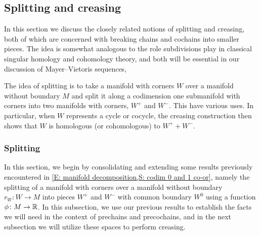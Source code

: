 \begin{comment}
	For the third product, we have by Joyce's convention that \red{I'm not getting a simple description of this because of Joyce's desription.
		Note that it requires using a specific identification of $TV \oplus TW$ with $TP \oplus TM$.
		I compute that even if we use identify $TM = \nu W \oplus TP \oplus \nu V$, $TV = \nu W \oplus TP$, and $TW = TP \oplus \nu V \oplus TP$ consistently, there's a sign of $(-1)^{m-w}$ from the determinant of Joyce's isomorphism, and then he enforces another factor of $(-1)^{mw}$ by hand.
		Yuck.
		And this is before comparing the actual orientations of things - yuck.
		We'll have to think some more about this.
	}.
\end{comment}

\subsection{Splitting and creasing}\label{S: splitting and creasing}

In this section we discuss the closely related notions of splitting and creasing, both of which are concerned with breaking chains and cochains into smaller pieces.
The idea is somewhat analogous to the role subdivisions play in classical singular homology and cohomology theory, and both will be essential in our discussion of Mayer--Vietoris sequences,

The idea of splitting is to take a manifold with corners $W$ over a manifold without boundary $M$ and split it along a codimension one submanifold with corners into two manifolds with corners, $W^+$ and $W^-$.
This have various uses.
In particular, when $W$ represents a cycle or cocycle, the creasing construction then shows that $W$ is homologous (or cohomologous) to $W^+ + W^-$.


\subsubsection{Splitting}\label{S: splitting}
In this section, we begin by consolidating and extending some results previously encountered in \cref{E: manifold decomposition,S: codim 0 and 1 co-or}, namely the splitting of a manifold with corners over a manifold without boundary $r_W \colon W \to M$ into pieces $W^+$ and $W^-$ with common boundary $W^0$ using a function $\phi \colon M \to \mathbb{R}$.
In this subsection, we use our previous results to establish the facts we will need in the context of prechains and precochains, and in the next subsection we will utilize these spaces to perform creasing.

